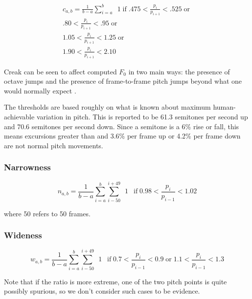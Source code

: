 \documentclass[11pt]{article}
\begin{document}
\begin{multline}
c_{a,b} = \frac{1}{b-a} \sum\limits_{i=a}^b \enspace 1 \operatorname{if}  .475 < \frac{p_i}{p_{i+1}} < .525 \operatorname{or} \\  .80 < \frac{p_i}{ p_{i+1}} < .95  \operatorname{or} \\ 1.05 < \frac{p_i}{ p_{i+1}} < 1.25 \operatorname{or} \\ 1.90 < \frac{p_i}{ p_{i+1}} < 2.10
\end{multline}

Creak can be seen to affect computed $F_0$ in two main ways: the
presence of octave jumps and the presence of frame-to-frame pitch
jumps beyond what one would normally expect \cite{keating15}.

The thresholds are based roughly on what is known about maximum
human-achievable variation in pitch.  This is reported to be 61.3
semitones per second up and 70.6 semitones per second
down\cite{xu02-pitch-change-rate}.  Since a semitone is a 6\% rise or
fall, this means excursions greater than and 3.6\% per frame up or
4.2\% per frame down are not normal pitch movements. 


\subsubsection{Narrowness}

\begin{equation}
n_{a,b} = \frac{1}{b-a} \sum\limits_{i=a}^b \sum\limits_{i-50}^{i+49} \enspace 1 \enspace \operatorname{if} 0.98 <  \frac{p_i}{p_{i-1}} < 1.02 
\end{equation}

where 50 refers to 50 frames.


\subsubsection{Wideness}

\begin{equation}
w_{a,b} = \frac{1}{b-a} \sum\limits_{i=a}^b \sum\limits_{i-50}^{i+49} \enspace 1 \enspace \operatorname{if} 0.7 <  \frac{p_i}{p_{i-1}} < 0.9 \operatorname{or} 1.1 <  \frac{p_i}{p_{i-1}} < 1.3
\end{equation}

Note that if the ratio is more extreme, one of the two pitch points is
quite possibly spurious, so we don't consider such cases to be evidence. 
\end{document}
